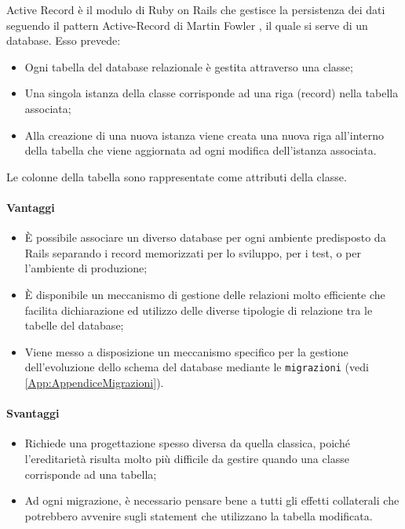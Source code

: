 \label{sec:ActiveRecord}
Active Record è il modulo di Ruby on Rails che gestisce la persistenza dei dati seguendo il pattern Active-Record di Martin Fowler 
, il quale si serve di un database.
Esso prevede:
\begin{itemize}
\item Ogni tabella del database relazionale è gestita attraverso una classe;
\item Una singola istanza della classe corrisponde ad una riga (record) nella tabella associata;
\item Alla creazione di una nuova istanza viene creata una nuova riga all'interno della tabella che viene aggiornata ad ogni modifica dell'istanza associata.
\end{itemize}
Le colonne della tabella sono rappresentate come attributi della classe.

\paragraph{Vantaggi} 
\begin{itemize}
	\item È possibile associare un diverso database per ogni ambiente predisposto da Rails separando i record memorizzati per lo sviluppo, per i test, o per l'ambiente di produzione;
	\item È disponibile un meccanismo di gestione delle relazioni molto efficiente che facilita dichiarazione ed utilizzo delle diverse tipologie di relazione tra le tabelle del database;
	\item Viene messo a disposizione un meccanismo specifico per la gestione dell'evoluzione dello schema del database mediante le \texttt{migrazioni} (vedi \autoref{App:AppendiceMigrazioni}). 
\end{itemize} 
\paragraph{Svantaggi}
\begin{itemize}
	\item Richiede una progettazione spesso diversa da quella classica, poiché l'ereditarietà risulta molto più difficile da gestire quando una classe corrisponde ad una tabella;
	\item Ad ogni migrazione, è necessario pensare bene a tutti gli effetti collaterali che potrebbero avvenire sugli statement che utilizzano la tabella modificata.
\end{itemize} 

